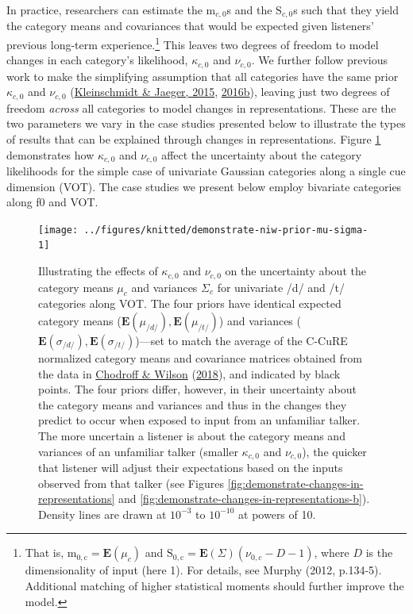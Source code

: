 \documentclass[
  11pt,
  english,
  man,floatsintext]{apa6}
\begin{document}
In practice, researchers can estimate the \(\mathrm{m}_{c,0}\)s and the \(\mathrm{S}_{c,0}\)s such that they yield the category means and covariances that would be expected given listeners' previous long-term experience.\footnote{That is, \(\mathrm{m_{0,c}} = \mathbf{E}(\mu_c)\) and \(\mathrm{S_{0,c}} = \mathbf{E}(\Sigma)(\nu_{0,c}-D-1)\), where \(D\) is the dimensionality of input (here 1). For details, see Murphy (2012, p.134-5). Additional matching of higher statistical moments should further improve the model.} This leaves two degrees of freedom to model changes in each category's likelihood, \(\kappa_{c,0}\) and \(\nu_{c,0}\). We further follow previous work to make the simplifying assumption that all categories have the same prior \(\kappa_{c,0}\) and \(\nu_{c,0}\) (\protect\hyperlink{ref-kleinschmidt-jaeger2015}{Kleinschmidt \& Jaeger, 2015}, \protect\hyperlink{ref-kleinschmidt-jaeger2016cogsci}{2016b}), leaving just two degrees of freedom \emph{across} all categories to model changes in representations. These are the two parameters we vary in the case studies presented below to illustrate the types of results that can be explained through changes in representations. Figure \ref{fig:demonstrate-niw-prior-mu-sigma} demonstrates how \(\kappa_{c,0}\) and \(\nu_{c,0}\) affect the uncertainty about the category likelihoods for the simple case of univariate Gaussian categories along a single cue dimension (VOT). The case studies we present below employ bivariate categories along f0 and VOT.



\begin{figure}

{\centering \texttt{[image: ../figures/knitted/demonstrate-niw-prior-mu-sigma-1]} 

}

\caption{Illustrating the effects of \(\kappa_{c,0}\) and \(\nu_{c,0}\) on the uncertainty about the category means \(\mu_c\) and variances \(\Sigma_c\) for univariate /d/ and /t/ categories along VOT. The four priors have identical expected category means (\(\mathbf{E}(\mu_{/d/}), \mathbf{E}(\mu_{/t/})\)) and variances (\(\mathbf{E}(\sigma_{/d/}), \mathbf{E}(\sigma_{/t/})\))---set to match the average of the C-CuRE normalized category means and covariance matrices obtained from the data in \protect\hyperlink{ref-chodroff-wilson2018}{Chodroff \& Wilson} (\protect\hyperlink{ref-chodroff-wilson2018}{2018}), and indicated by black points. The four priors differ, however, in their uncertainty about the category means and variances and thus in the changes they predict to occur when exposed to input from an unfamiliar talker. The more uncertain a listener is about the category means and variances of an unfamiliar talker (smaller \(\kappa_{c,0}\) and \(\nu_{c,0}\)), the quicker that listener will adjust their expectations based on the inputs observed from that talker (see Figures \ref{fig:demonstrate-changes-in-representations} and \ref{fig:demonstrate-changes-in-representations-b}). Density lines are drawn at \(10^{-3}\) to \(10^{-10}\) at powers of 10.}\label{fig:demonstrate-niw-prior-mu-sigma}
\end{figure}
\end{document}
